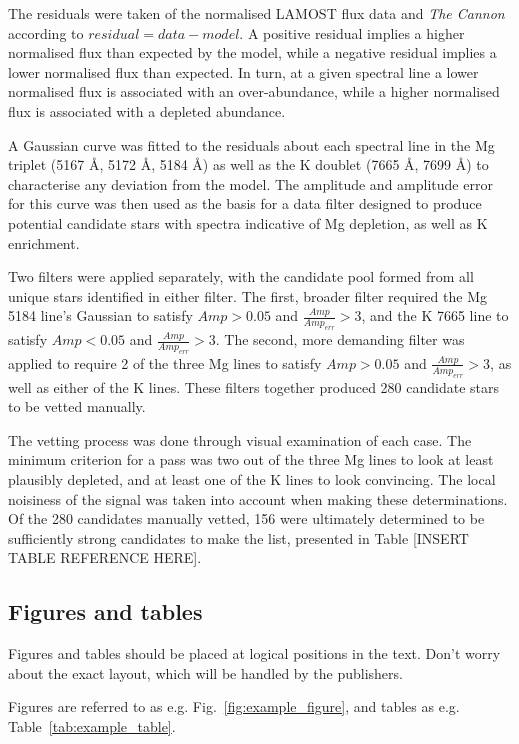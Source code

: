 \documentclass[a4paper,fleqn,usenatbib]{mnras}
\begin{document}
The residuals were taken of the normalised LAMOST flux data and 
\textit{The Cannon} according to $residual=data-model$. A positive residual implies a higher normalised flux than expected by the model, while a negative residual implies a lower normalised flux than expected. In turn, at a given spectral line a lower normalised flux is associated with an over-abundance, while a higher normalised flux is associated with a depleted abundance.

A Gaussian curve was fitted to the residuals about each spectral line in the Mg triplet (5167 \AA, 5172 \AA, 5184 \AA) as well as the K doublet (7665 \AA, 7699 \AA) to characterise any deviation from the model. The amplitude and amplitude error for this curve was then used as the basis for a data filter designed to produce potential candidate stars with spectra indicative of Mg depletion, as well as K enrichment.

Two filters were applied separately, with the candidate pool formed from all unique stars identified in either filter. The first, broader filter required the Mg 5184 line's Gaussian to satisfy $Amp > 0.05$ and $\frac{Amp}{Amp_{err}}>3$, and the K 7665 line to satisfy $Amp < 0.05$ and $\frac{Amp}{Amp_{err}}>3$. The second, more demanding filter was applied to require 2 of the three Mg lines to satisfy $Amp > 0.05$ and $\frac{Amp}{Amp_{err}}>3$, as well as either of the K lines. These filters together produced 280 candidate stars to be vetted manually.

The vetting process was done through visual examination of each case. The minimum criterion for a pass was two out of the three Mg lines to look at least plausibly depleted, and at least one of the K lines to look convincing. The local noisiness of the signal was taken into account when making these determinations. Of the 280 candidates manually vetted, 156 were ultimately determined to be sufficiently strong candidates to make the list, presented in Table [INSERT TABLE REFERENCE HERE].

\subsection{Figures and tables}

Figures and tables should be placed at logical positions in the text. Don't
worry about the exact layout, which will be handled by the publishers.

Figures are referred to as e.g. Fig.~\ref{fig:example_figure}, and tables as
e.g. Table~\ref{tab:example_table}.
\end{document}
